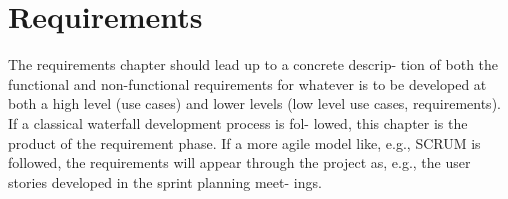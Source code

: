 \chapter{Requirements}

The requirements chapter should lead up to a concrete descrip- tion of both the functional and non-functional requirements for whatever is to be developed at both a high level (use cases) and lower levels (low level use cases, requirements). If a classical waterfall development process is fol- lowed, this chapter is the product of the requirement phase. If a more agile model like, e.g., SCRUM is followed, the requirements will appear through the project as, e.g., the user stories developed in the sprint planning meet- ings.

